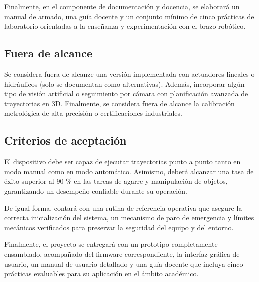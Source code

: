 Finalmente, en el componente de documentación y docencia, se elaborará un manual de armado, una guía docente y un conjunto mínimo de cinco prácticas de laboratorio orientadas a la enseñanza y experimentación con el brazo robótico.


\subsection{Fuera de alcance}
Se considera fuera de alcanze una versión implementada con actuadores lineales o hidráulicos (solo se documentan como alternativas). Además, incorporar algún tipo de visión artificial o seguimiento por cámara con planificación avanzada de trayectorias en 3D. Finalmente, se considera fuera de alcance la calibración metrológica de alta precisión o certificaciones industriales.


\subsection{Criterios de aceptación}
El dispositivo debe ser capaz de ejecutar trayectorias punto a punto tanto en modo manual como en modo automático. Asimismo, deberá alcanzar una tasa de éxito superior al 90 \% en las tareas de agarre y manipulación de objetos, garantizando un desempeño confiable durante su operación.

De igual forma, contará con una rutina de referencia operativa que asegure la correcta inicialización del sistema, un mecanismo de paro de emergencia y límites mecánicos verificados para preservar la seguridad del equipo y del entorno.

Finalmente, el proyecto se entregará con un prototipo completamente ensamblado, acompañado del firmware correspondiente, la interfaz gráfica de usuario, un manual de usuario detallado y una guía docente que incluya cinco prácticas evaluables para su aplicación en el ámbito académico.
